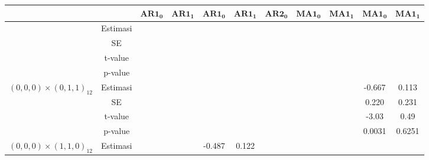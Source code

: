 \begin{enumerate}[label=\alph*.]
\begin{longtable}{|c|c|c|c|c|c|c|c|c|c|c|}
            & &
            $\mathbf{AR1_0}$ & $\mathbf{AR1_1}$ &
            $\mathbf{AR1_0}$ & $\mathbf{AR1_1}$ & $\mathbf{AR2_0}$ &
            $\mathbf{MA1_0}$ & $\mathbf{MA1_1}$ &
            $\mathbf{MA1_0}$ & $\mathbf{MA1_1}$ \\
            \hline
            \endhead

            \hline
            \endfoot
            \hline
            \endlastfoot

            \multirow{4}{*}{$(0,0,0)\times(0,1,0)_{12}$}
            & Estimasi
            & {} & {}
            & {} & {} & {}
            & {} & {}
            & {} & {} \\ \cline{2-11}

            & SE
            & {} & {}
            & {} & {} & {}
            & {} & {}
            & {} & {} \\ \cline{2-11}

            & t-value
            & {} & {}
            & {} & {} & {}
            & {} & {}
            & {} & {} \\ \cline{2-11}

            & p-value
            & {} & {}
            & {} & {} & {}
            & {} & {}
            & {} & {} \\ \hline

            \multirow{4}{*}{$(0,0,0)\times(0,1,1)_{12}$}
            & Estimasi
            & {} & {}
            & {} & {} & {}
            & {} & {}
            & {-0.667} & {0.113} \\ \cline{2-11}

            & SE
            & {} & {}
            & {} & {} & {}
            & {} & {}
            & {0.220} & {0.231} \\ \cline{2-11}

            & t-value
            & {} & {}
            & {} & {} & {}
            & {} & {}
            & {-3.03} & {0.49} \\ \cline{2-11}

            & p-value
            & {} & {}
            & {} & {} & {}
            & {} & {}
            & {0.0031} & {0.6251} \\ \hline

            \multirow{4}{*}{$(0,0,0)\times(1,1,0)_{12}$}
            & Estimasi
            & {} & {}
            & {-0.487} & {0.122} & {}
            & {} & {}
            & {} & {} \\ \cline{2-11}


\end{longtable}
\end{enumerate}
